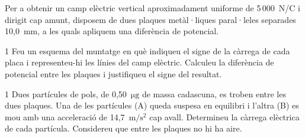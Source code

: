 Per a obtenir un camp elèctric vertical aproximadament uniforme de 5\,000~N/C i dirigit cap amunt, disposem de dues plaques metàl·liques paral·leles separades 10,0~mm, a les quals apliquem una diferència de potencial.

\begin{apartat}{1}
Feu un esquema del muntatge en què indiqueu el signe de la càrrega de cada placa i representeu-hi les línies del camp elèctric. Calculeu la diferència de potencial entre les plaques i justifiqueu el signe del resultat.
\end{apartat}

\begin{apartat}{1}
Dues partícules de pols, de 0,50~$\mathrm{\mu g}$ de massa cadascuna, es troben entre les dues plaques. Una de les partícules (A) queda suspesa en equilibri i l'altra (B) es mou amb una acceleració de 14,7~$\mathrm{m/s^2}$ cap avall. Determineu la càrrega elèctrica de cada partícula. Considereu que entre les plaques no hi ha aire.
\end{apartat}

